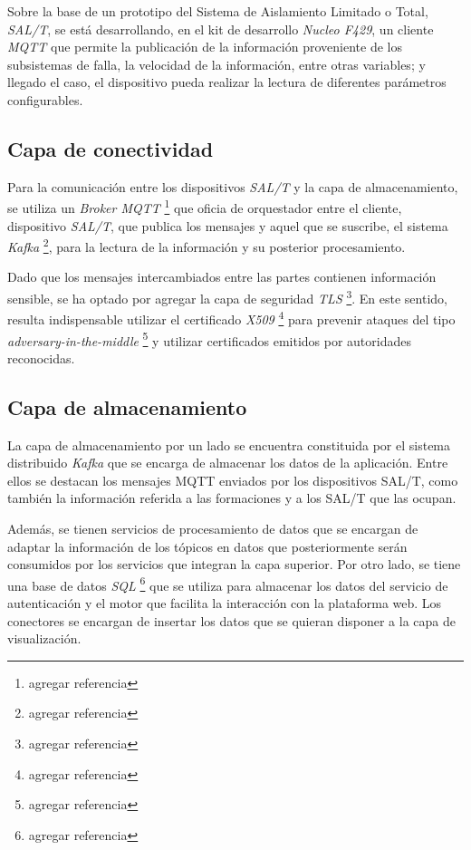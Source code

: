 \documentclass[a4paper]{IEEEtran}
\begin{document}
Sobre la base de un prototipo del Sistema de Aislamiento Limitado o Total, \textit{SAL/T}, se está desarrollando, en el kit de desarrollo \textit{Nucleo F429}, un cliente \textit{MQTT} que permite la publicación de la información proveniente de los subsistemas de falla, la velocidad de la información, entre otras variables; y llegado el caso, el dispositivo pueda realizar la lectura de diferentes parámetros configurables.

\subsection{Capa de conectividad}

Para la comunicación entre los dispositivos \textit{SAL/T} y la capa de almacenamiento, se utiliza un \textit{Broker MQTT} \cite{b3} \footnote{agregar referencia} que oficia de orquestador entre el cliente, dispositivo \textit{SAL/T}, que publica los mensajes y aquel que se suscribe, el sistema \textit{Kafka} \cite{b4} \footnote{agregar referencia}, para la lectura de la información y su posterior procesamiento. 

Dado que los mensajes intercambiados entre las partes contienen información sensible, se ha optado por agregar la capa de seguridad \textit{TLS} \cite{b5} \footnote{agregar referencia}. En este sentido, resulta indispensable utilizar el certificado \textit{X509} \cite{b6} \footnote{agregar referencia} para prevenir ataques del tipo \textit{adversary-in-the-middle} \cite{b7} \footnote{agregar referencia} y utilizar certificados emitidos por autoridades reconocidas.


\subsection{Capa de almacenamiento}

La capa de almacenamiento por un lado se encuentra constituida por el sistema distribuido \textit{Kafka} que se encarga de almacenar los datos de la aplicación. Entre ellos se destacan los mensajes MQTT enviados por los dispositivos SAL/T, como también la información referida a las formaciones y a los SAL/T que las ocupan. 

Además, se tienen servicios de procesamiento de datos que se encargan de adaptar la información de los tópicos en datos que posteriormente serán consumidos por los servicios que integran la capa superior. Por otro lado, se tiene una base de datos \textit{SQL} \cite{b8} \footnote{agregar referencia} que se utiliza para almacenar los datos del servicio de autenticación y el motor que facilita la interacción con la plataforma web. Los conectores se encargan de insertar los datos que se quieran disponer a la capa de visualización.
\end{document}
